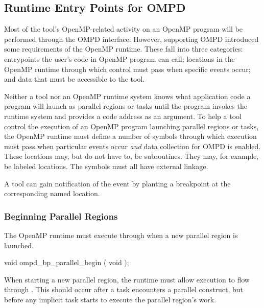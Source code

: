 \subsection{Runtime Entry Points for OMPD}
\label{subsec:runtime-entry-points-for-ompd}

Most of the tool's OpenMP-related activity on an OpenMP
program will be performed through the OMPD interface.
However, supporting OMPD introduced some requirements of the OpenMP
runtime.
These fall into three categories: entrypoints the user's code in
OpenMP program can call; locations in the OpenMP runtime through
which control must pass when specific events occur; and data that must
be accessible to the tool.

Neither a tool nor an OpenMP runtime system knows what
application code a program will launch as parallel regions
or tasks until the program invokes the runtime system and
provides a code address as an argument.
To help a tool control the execution of an OpenMP program
launching parallel regions or tasks,
the OpenMP runtime must define a number of symbols
through which execution must pass when particular events occur
\emph{and} data collection for OMPD is enabled.
These locations may, but do not have to, be subroutines.
They may, for example, be labeled locations.
The symbols must all have external  linkage.

A tool can gain notification of the event by planting a breakpoint
at the corresponding named location.

\subsubsection{Beginning Parallel Regions}
\label{subsubsec:ompd_bp_parallel_begin}

\summary
The OpenMP runtime must execute through
 when a new parallel region is launched.


\begin{cspecific}
\begin{ompSyntax}
void ompd_bp_parallel_begin ( void );
\end{ompSyntax}
\end{cspecific}


\descr

When starting a new parallel region, the runtime must allow execution
to flow through .
This should occur after a task encounters a parallel construct,
but before any implicit task starts to execute the parallel
region's work.

